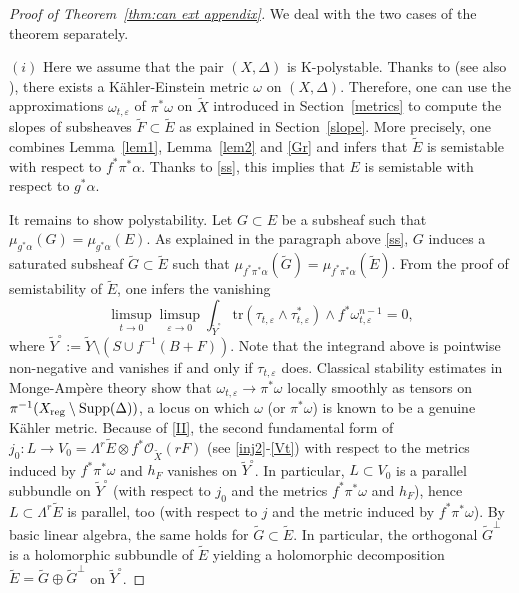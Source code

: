 \documentclass[12pt]{amsart}
\theoremstyle{definition}
\newcommand{\tX}{\widetilde{X}}
\newcommand{\tY}{\widetilde{Y}}
\newcommand{\tE}{\widetilde{E}}
\newcommand{\cO}{\mathcal{O}}
\newcommand{\Supp}{\mathrm{Supp}}
\numberwithin{equation}{section}
\newcommand{\ep}{\varepsilon}
\begin{document}
\begin{proof}[Proof of Theorem~\ref{thm:can ext appendix}]
We deal with the two cases of the theorem separately.

\smallskip

$(i)$ Here we assume that the pair $(X,\Delta)$ is K-polystable. Thanks to \cite[Theorem~5.2]{LXZ-HRFG} (see also \cite[Theorem~1.2]{Li-YTD}), there exists a K\"ahler-Einstein metric $\omega$ on $(X,\Delta)$. Therefore, one can use the approximations $\omega_{t,\ep}$ of $\pi^*\omega$ on $\tX$ introduced in Section~\ref{metrics} to compute the slopes of subsheaves $\widetilde F\subset \tE$ as explained in Section~\ref{slope}. More precisely, one combines Lemma~\ref{lem1}, Lemma~\ref{lem2} and \eqref{Gr} and infers that $\tE$ is semistable with respect to $f^*\pi^*\alpha$. Thanks to \eqref{ss}, this implies that $E$ is semistable with respect to $g^*\alpha$.

\medskip

It remains to show polystability. Let $G\subset E$ be a subsheaf such that $\mu_{g^*\alpha}(G)=\mu_{g^*\alpha}(E)$. As explained in the paragraph above \eqref{ss}, $G$ induces a saturated subsheaf $\tilde G\subset \tE$ such that $\mu_{f^*\pi^*\alpha}(\tilde G)=\mu_{f^*\pi^*\alpha}(\tE)$. From the proof of semistability of $\tE$, one infers the vanishing
\begin{equation}
\label{II}
\limsup_{t\to 0}\limsup_{\ep\to0} \int_{\tY^\circ} \mathrm{tr}(\tau_{t,\ep}\wedge \tau_{t,\ep}^*)\wedge f^*\omega_{t,\ep}^{n-1}=0,
\end{equation}
where $\tY^\circ:=\tY\setminus (S\cup f^{-1}(B+F))$. Note that the integrand above is pointwise non-negative and vanishes if and only if $\tau_{t,\ep}$ does. Classical stability estimates in Monge-Amp\`ere theory show that $\omega_{t,\ep}\to \pi^*\omega$ locally smoothly as tensors on $\pi^{-1}(X_{\rm reg}\setminus \Supp(\Delta))$, a locus on which $\omega$ (or $\pi^*\omega$) is known to be a genuine K\"ahler metric. Because of \eqref{II}, the second fundamental form of $j_0:L\to V_0=\Lambda^r\tE\otimes f^*\cO_{\tX}(rF)$ (see \eqref{inj2}-\eqref{Vt}) with respect to the metrics induced by $f^*\pi^*\omega$ and $h_F$ vanishes on $\tY^\circ$. In particular, $L\subset V_0$ is a parallel subbundle on $\tY^\circ$ (with respect to $j_0$ and the metrics $f^*\pi^*\omega$ and $h_F$), hence $L\subset \Lambda^r\tE$ is parallel, too (with respect to $j$ and the metric induced by $f^*\pi^*\omega$). By basic linear algebra, the same holds for $\tilde G\subset \tE$. In particular, the orthogonal $\tilde G^\perp$ is a holomorphic subbundle of $\tE$ yielding a holomorphic decomposition $\tE=\tilde G\oplus \tilde G^\perp$ on $\tY^\circ$.


\end{proof}
\end{document}
